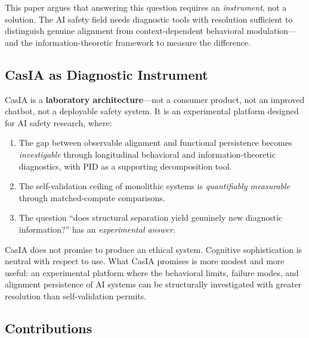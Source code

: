 \documentclass[11pt,a4paper]{article}
\theoremstyle{definition}
\begin{document}
This paper argues that answering this question requires an \emph{instrument}, not a solution. The AI safety field needs diagnostic tools with resolution sufficient to distinguish genuine alignment from context-dependent behavioral modulation---and the information-theoretic framework to measure the difference.

\subsection{CasIA as Diagnostic Instrument}

CasIA is a \textbf{laboratory architecture}---not a consumer product, not an improved chatbot, not a deployable safety system. It is an experimental platform designed for AI safety research, where:
\begin{enumerate}[leftmargin=*,itemsep=3pt]
\item The gap between observable alignment and functional persistence becomes \emph{investigable} through longitudinal behavioral and information-theoretic diagnostics, with PID as a supporting decomposition tool.
\item The self-validation ceiling of monolithic systems is \emph{quantifiably measurable} through matched-compute comparisons.
\item The question ``does structural separation yield genuinely new diagnostic information?'' has an \emph{experimental answer}.
\end{enumerate}

CasIA does not promise to produce an ethical system. Cognitive sophistication is neutral with respect to use. What CasIA promises is more modest and more useful: an experimental platform where the behavioral limits, failure modes, and alignment persistence of AI systems can be structurally investigated with greater resolution than self-validation permits.

\subsection{Contributions}
\end{document}
